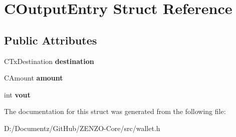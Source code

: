 \hypertarget{struct_c_output_entry}{}\section{C\+Output\+Entry Struct Reference}
\label{struct_c_output_entry}
\subsection*{Public Attributes}
\begin{DoxyCompactItemize}
\item 
\mbox{\label{struct_c_output_entry_af5961d67591eb98aefe95bf60f2a13e6}} 
C\+Tx\+Destination {\bfseries destination}
\item 
\mbox{\label{struct_c_output_entry_acb32c29f06f4b66d1de6bcec47f8f704}} 
C\+Amount {\bfseries amount}
\item 
\mbox{\label{struct_c_output_entry_af2c29f7df8dc2a44513b906c16f8b4ea}} 
int {\bfseries vout}
\end{DoxyCompactItemize}


The documentation for this struct was generated from the following file\+:\begin{DoxyCompactItemize}
\item 
D\+:/\+Documentz/\+Git\+Hub/\+Z\+E\+N\+Z\+O-\/\+Core/src/wallet.\+h\end{DoxyCompactItemize}
